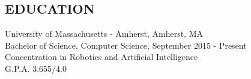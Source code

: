 \documentclass{res}
\begin{document}
 
\address{\bf  PRESENT ADDRESS\\145 Commonwealth Avenue\\Elm 402\\Amherst, MA 01003-9253\\(908) 902-2202}
\address{\bf PERMANENT ADDRESS \\ 117 Agress Road \\  Millstone, NJ 08510 \\  (908) 902-2202}
\begin{resume}
\section{EDUCATION}          
    University of Massachusetts - Amherst, Amherst, MA  \\        
    Bachelor of Science, Computer Science, September 2015 - Present   \\       
    Concentration in Robotics and Artificial Intelligence       \\
    G.P.A. 3.655/4.0    
    \vspace{-0.2in}

\end{resume}
\end{document}
